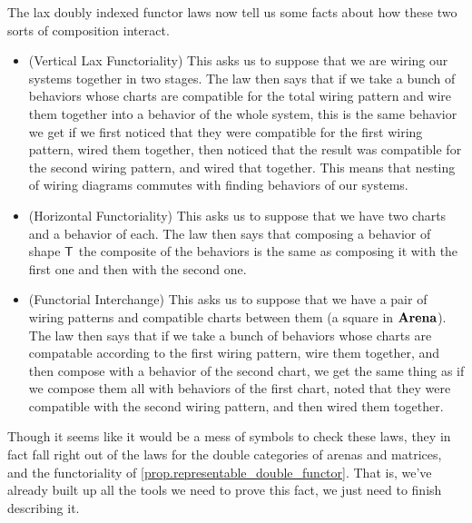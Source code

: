 \documentclass[DynamicalBook]{subfiles}
\begin{document}
The lax doubly indexed functor laws now tell us some facts about how these two
sorts of composition interact.
\begin{itemize}
  \item (Vertical Lax Functoriality) This asks us to suppose that we are wiring
    our systems together in two stages. The law then says that if we take a
    bunch of behaviors whose charts are compatible for the total wiring pattern
    and wire them together into a behavior of the whole system, this is the same
    behavior we get if we first noticed that they were compatible for the first
    wiring pattern, wired them together, then noticed that the result was
    compatible for the second wiring pattern, and wired that together. This
    means that nesting of wiring diagrams commutes with finding behaviors of our systems.
  \item (Horizontal Functoriality) This asks us to suppose that we have two
    charts and a behavior of each. The law then says that composing a behavior
    of shape $\mathsf{T}$ the composite of the behaviors is the same as composing
    it with the first one and then with the second one.
  \item (Functorial Interchange) This asks us to suppose that we have a pair of
    wiring patterns and compatible charts between them (a square in $\textbf{Arena}$). The law then says that if we
    take a bunch of behaviors whose charts are compatable according to the first
    wiring pattern, wire them together, and then compose with a behavior of the
    second chart, we get the same thing as if we compose them all with behaviors
    of the first chart, noted that they were compatible with the second wiring
    pattern, and then wired them together.
\end{itemize}

Though it seems like it would be a mess of symbols to check these laws, they in
fact fall right out of the laws for the double categories of arenas and
matrices, and the functoriality of \cref{prop.representable_double_functor}.
That is, we've already built up all the tools we need to prove this fact, we
just need to finish describing it.
\end{document}
